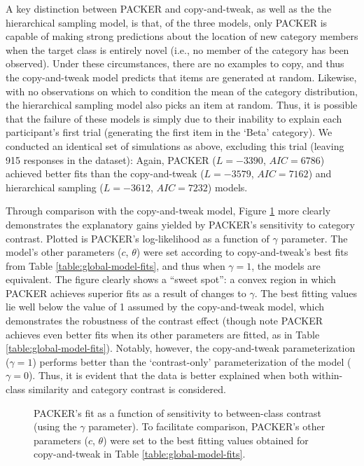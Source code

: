 \documentclass[12pt]{article}
\newcommand\inputpgf[2]{{
\let\pgfimageWithoutPath\pgfimage
\renewcommand{\pgfimage}[2][]{\pgfimageWithoutPath[##1]{#1/##2}}

}}
\begin{document}
\begin{flushleft}
A key distinction between PACKER and copy-and-tweak, as well as the the hierarchical sampling model, is that, of the three models, only PACKER is capable of making strong predictions about the location of new category members when the target class is entirely novel (i.e., no member of the category has been observed). Under these circumstances, there are no examples to copy, and thus the copy-and-tweak model predicts that items are generated at random. Likewise, with no observations on which to condition the mean of the category distribution, the hierarchical sampling model also picks an item at random. Thus, it is possible that the failure of these models is simply due to their inability to explain each participant's first trial (generating the first item in the `Beta' category). We conducted an identical set of simulations as above, excluding this trial (leaving 915 responses in the dataset): Again, PACKER ($L = -3390$, $AIC = 6786$) achieved better fits than the copy-and-tweak ($L = -3579$, $AIC = 7162$) and hierarchical sampling ($L=-3612$, $AIC = 7232$) models.

Through comparison with the copy-and-tweak model, Figure \ref{fig:packer-loglike} more clearly demonstrates the explanatory gains yielded by PACKER's sensitivity to category contrast. Plotted is PACKER's log-likelihood as a function of $\gamma$ parameter. The model's other parameters ($c$, $\theta$) were set according to copy-and-tweak's best fits from Table \ref{table:global-model-fits}, and thus when $\gamma=1$, the models are equivalent. The figure clearly shows a ``sweet spot'':  a convex region in which PACKER achieves superior fits as a result of changes to $\gamma$. The best fitting values lie well below the value of 1 assumed by the copy-and-tweak model, which demonstrates the robustness of the contrast effect (though note PACKER achieves even better fits when its other parameters are fitted, as in Table \ref{table:global-model-fits}). Notably, however, the copy-and-tweak parameterization ($\gamma=1$) performs better than the `contrast-only' parameterization of the model ($\gamma = 0$). Thus, it is evident that the data is better explained when both within-class similarity and category contrast is considered.

\begin{figure}
    \begin{center}
    \inputpgf{figs/}{packer-loglike.pgf}
    \caption{PACKER's fit as a function of sensitivity to between-class contrast (using the $\gamma$ parameter). To facilitate comparison, PACKER's other parameters ($c$, $\theta$) were set to the best fitting values obtained for copy-and-tweak in Table \ref{table:global-model-fits}. }
    \label{fig:packer-loglike}
    \end{center}
\end{figure}



\end{flushleft}
\end{document}
